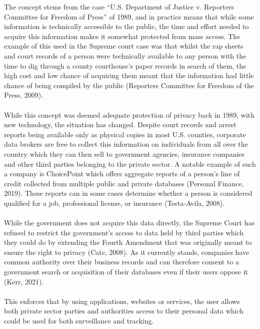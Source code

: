 \documentclass[11pt]{article}
\begin{document}
The concept stems from the case “U.S. Department of Justice v. Reporters Committee for Freedom of Press” of 1989, and in practice means that while some information is technically accessible to the public, the time and effort needed to acquire this information makes it somewhat protected from mass access. The example of this used in the Supreme court case was that whilst the rap sheets and court records of a person were technically available to any person with the time to dig through a county courthouse’s paper records in search of them, the high cost and low chance of acquiring them meant that the information had little chance of being compiled by the public (Reporters Committee for Freedom of the Press, 2009).  \\ \\

While this concept was deemed adequate protection of privacy back in 1989, with new technology, the situation has changed. Despite court records and arrest reports being available only as physical copies in most U.S. counties, corporate data brokers are free to collect this information on individuals from all over the country which they can then sell to government agencies, insurance companies and other third parties belonging to the private sector. A notable example of such a company is ChoicePoint which offers aggregate reports of a person’s line of credit collected from multiple public and private databases (Personal Finance, 2019). These reports can in some cases determine whether a person is considered qualified for a job, professional license, or insurance (Testa-Avila, 2008). \\ \\

While the government does not acquire this data directly, the Supreme Court has refused to restrict the government’s access to data held by third parties which they could do by extending the Fourth Amendment that was originally meant to ensure the right to privacy (Cate, 2008). As it currently stands, companies have common authority over their business records and can therefore consent to a government search or acquisition of their databases even if their users oppose it (Kerr, 2021). \\ \\

This enforces that by using applications, websites or services, the user allows both private sector parties and authorities access to their personal data which could be used for both surveillance and tracking. 
\end{document}
